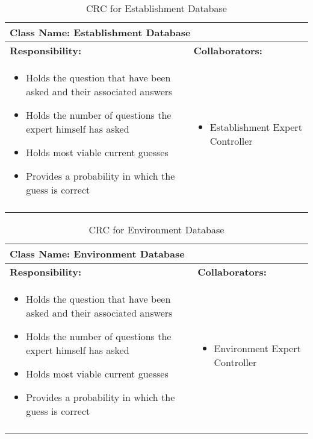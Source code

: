 \documentclass[titlepage]{article}
\begin{document}
	
\newpage
	\begin{longtable}{| p{} | p{} |}
			\hline
			 \multicolumn{2}{|l|}{\textbf{Class Name: Establishment Database}} \\
			\hline
			\textbf{Responsibility:} & \textbf{Collaborators:} \\
			\hline
				\begin{itemize}
					\item Holds the question that have been asked and their associated answers
					\item Holds the number of questions the expert himself has asked
					\item Holds most viable current guesses
					\item Provides a probability in which the guess is correct
				\end{itemize} & 
				\begin{itemize}
					\item Establishment Expert Controller
				\end{itemize} 
				\\
			\hline
		\caption{CRC for Establishment Database}
	\end{longtable}
	
	\begin{longtable}{| p{} | p{} |}
			\hline
			 \multicolumn{2}{|l|}{\textbf{Class Name: Environment Database}} \\
			\hline
			\textbf{Responsibility:} & \textbf{Collaborators:} \\
			\hline
				\begin{itemize}
					\item Holds the question that have been asked and their associated answers
					\item Holds the number of questions the expert himself has asked
					\item Holds most viable current guesses
					\item Provides a probability in which the guess is correct
				\end{itemize} & 
				\begin{itemize}
					\item Environment Expert Controller
				\end{itemize} 
				\\
			\hline
		\caption{CRC for Environment Database}
	\end{longtable}
	
\end{document}
